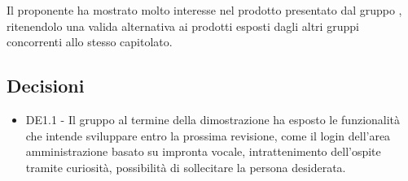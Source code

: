 \documentclass[a4paper,titlepage]{article}
\begin{document}
Il proponente \PROPONENTE{} ha mostrato molto interesse nel prodotto presentato dal gruppo \GRUPPO{}, ritenendolo una valida alternativa ai prodotti esposti dagli altri gruppi concorrenti allo stesso capitolato.
		\subsection{Decisioni}
		\begin{itemize}
			\item DE1.1 - Il gruppo \GRUPPO{} al termine della dimostrazione ha esposto le funzionalità che intende sviluppare entro la prossima revisione, come il login dell'area amministrazione basato su impronta vocale, intrattenimento dell'ospite tramite curiosità, possibilità di sollecitare la persona desiderata.  
		\end{itemize}
		
		
	
\end{document}
